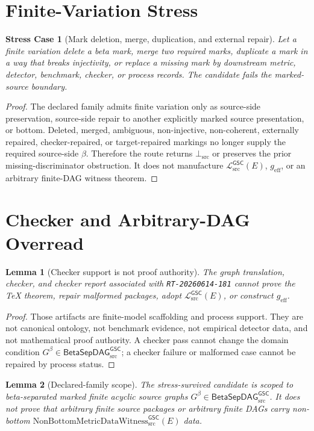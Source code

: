 \documentclass[11pt]{article}
\newcommand{\Witness}{\mathrm{NonBottomMetricDataWitness}_{\mathrm{src}}^{\mathsf{GSC}}}
\newcommand{\MetricData}{\mathcal{L}_{\mathrm{src}}^{\mathsf{GSC}}}
\newcommand{\BottomSrc}{\bot_{\mathrm{src}}}
\newcommand{\geff}{g_{\mathrm{eff}}}
\newcommand{\BetaGraph}{\mathsf{BetaSepDAG}_{\mathrm{src}}^{\mathsf{GSC}}}
\newtheorem{lemma}{Lemma}
\newtheorem{stresscase}{Stress Case}
\begin{document}
\section{Finite-Variation Stress}

\begin{stresscase}[Mark deletion, merge, duplication, and external repair]
Let a finite variation delete a beta mark, merge two required marks, duplicate
a mark in a way that breaks injectivity, or replace a missing mark by
downstream metric, detector, benchmark, checker, or process records. The
candidate fails the marked-source boundary.
\end{stresscase}

\begin{proof}
The declared family admits finite variation only as source-side preservation,
source-side repair to another explicitly marked source presentation, or
bottom. Deleted, merged, ambiguous, non-injective, non-coherent, externally
repaired, checker-repaired, or target-repaired markings no longer supply the
required source-side \(\beta\). Therefore the route returns \(\BottomSrc\) or
preserves the prior missing-discriminator obstruction. It does not manufacture
\(\MetricData(E)\), \(\geff\), or an arbitrary finite-DAG witness theorem.
\end{proof}

\section{Checker and Arbitrary-DAG Overread}

\begin{lemma}[Checker support is not proof authority]
The graph translation, checker, and checker report associated with
\texttt{RT-20260614-181} cannot prove the TeX theorem, repair malformed
packages, adopt \(\MetricData(E)\), or construct \(\geff\).
\end{lemma}

\begin{proof}
Those artifacts are finite-model scaffolding and process support. They are not
canonical ontology, not benchmark evidence, not empirical detector data, and
not mathematical proof authority. A checker pass cannot change the domain
condition \(G^\beta\in\BetaGraph\); a checker failure or malformed case cannot
be repaired by process status.
\end{proof}

\begin{lemma}[Declared-family scope]
The stress-survived candidate is scoped to beta-separated marked finite
acyclic source graphs \(G^\beta\in\BetaGraph\). It does not prove that
arbitrary finite source packages or arbitrary finite DAGs carry non-bottom
\(\Witness(E)\) data.
\end{lemma}
\end{document}

